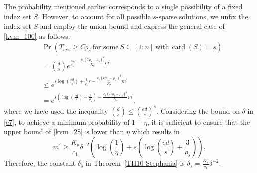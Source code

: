 \documentclass[12pt,draftcls,onecolumn]{IEEEtran}
\begin{document}
The probability mentioned earlier corresponds to a single possibility of a fixed index set $S$. However, to account for all possible $s$-sparse solutions, we unfix the index set $S$ and employ the union bound and express the general case of \eqref{kvm_100} as follows:
\begin{equation}
\label{kvm_28}
\begin{aligned}
&\operatorname{Pr}\left(T_{\mathrm{ave}}^{s}\geq C\rho_s~\text{for some}~S\subseteq[1:n]~\text{with}~\operatorname{card}(S)=s\right)\\&=\binom{d}{s}e^{\frac{3s}{\rho_s}-\frac{c_1\left(C\rho_s-\mu_s\right)^{2}}{K_s}m^{\prime}}\\&\leq e^{s\log\left(\frac{ed}{s}\right)+\frac{3}{\rho_s}s-\frac{c_1\left(C\rho_s-\mu_s\right)^{2}}{K_s}m^{\prime}}\\&=e^{s\left(\log\left(\frac{ed}{s}\right)+\frac{3}{\rho_s}\right)-\frac{c_1\left(C\rho_s-\mu_s\right)^{2}}{K_s}m^{\prime}},
\end{aligned}
\end{equation}
where we have used the inequality $\binom{d}{s}\leq\left(\frac{ed}{s}\right)^s$. 
Considering the bound on $\delta$ in \eqref{e7},
to achieve a minimum probability of $1-\eta$, it is sufficient to ensure that the upper bound of \eqref{kvm_28} is lower than $\eta$ which results in
\begin{equation}
\label{kvm_29}
m^{\prime}\geq\frac{K_s}{c_1}\delta^{-2}\left(\log\left(\frac{1}{\eta}\right)+s\left(\log\left(\frac{ed}{s}\right)+\frac{3}{\rho_s}\right)\right).
\end{equation}
Therefore, the constant $\delta_s$ in Theorem~\ref{TH10-Stephania} is $\delta_s=\frac{K_s}{c_1}\delta^{-2}$.
\end{document}
